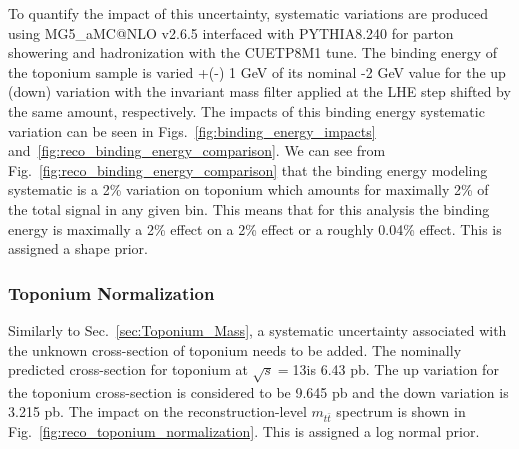 To quantify the impact of this uncertainty, systematic variations are produced using MG5\_aMC@NLO v2.6.5 interfaced with PYTHIA8.240 for parton showering and hadronization with the CUETP8M1 tune. The binding energy of the toponium sample is varied +(-) 1 GeV of its nominal -2 GeV value for the up (down) variation  with the invariant mass filter applied at the LHE step shifted by the same amount, respectively. The impacts of this binding energy systematic variation can be seen in Figs.~\ref{fig:binding_energy_impacts} and~\ref{fig:reco_binding_energy_comparison}. We can see from Fig.~\ref{fig:reco_binding_energy_comparison} that the binding energy modeling systematic is a 2\% variation on toponium which amounts for maximally 2\% of the total signal in any given bin. This means that for this analysis the binding energy is maximally a 2\% effect on a 2\% effect or a roughly 0.04\% effect. This is assigned a shape prior.



\subsubsection{Toponium Normalization}
\label{sec:Toponium_Normalization}
Similarly to Sec.~\ref{sec:Toponium_Mass}, a systematic uncertainty associated with the unknown cross-section of toponium needs to be added. The nominally predicted cross-section for toponium at $\sqrt{s}=$13\TeV is 6.43 pb. The up variation for the toponium cross-section is considered to be 9.645 pb and the down variation is 3.215 pb. The impact on the reconstruction-level $m_{t\bar{t}}$ spectrum is shown in Fig.~\ref{fig:reco_toponium_normalization}. This is assigned a log normal prior.

